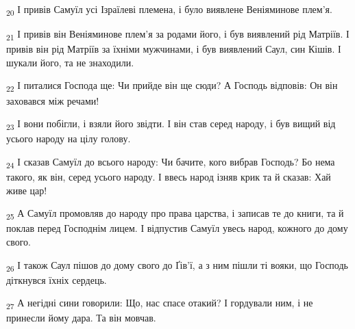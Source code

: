 \begin{tcolorbox}
\textsubscript{20} І привів Самуїл усі Ізраїлеві племена, і було виявлене Веніяминове плем'я.
\end{tcolorbox}
\begin{tcolorbox}
\textsubscript{21} І привів він Веніяминове плем'я за родами його, і був виявлений рід Матріїв. І привів він рід Матріїв за їхніми мужчинами, і був виявлений Саул, син Кішів. І шукали його, та не знаходили.
\end{tcolorbox}
\begin{tcolorbox}
\textsubscript{22} І питалися Господа ще: Чи прийде він ще сюди? А Господь відповів: Он він заховався між речами!
\end{tcolorbox}
\begin{tcolorbox}
\textsubscript{23} І вони побігли, і взяли його звідти. І він став серед народу, і був вищий від усього народу на цілу голову.
\end{tcolorbox}
\begin{tcolorbox}
\textsubscript{24} І сказав Самуїл до всього народу: Чи бачите, кого вибрав Господь? Бо нема такого, як він, серед усього народу. І ввесь народ ізняв крик та й сказав: Хай живе цар!
\end{tcolorbox}
\begin{tcolorbox}
\textsubscript{25} А Самуїл промовляв до народу про права царства, і записав те до книги, та й поклав перед Господнім лицем. І відпустив Самуїл увесь народ, кожного до дому свого.
\end{tcolorbox}
\begin{tcolorbox}
\textsubscript{26} І також Саул пішов до дому свого до Ґів'ї, а з ним пішли ті вояки, що Господь діткнувся їхніх сердець.
\end{tcolorbox}
\begin{tcolorbox}
\textsubscript{27} А негідні сини говорили: Що, нас спасе отакий? І гордували ним, і не принесли йому дара. Та він мовчав.
\end{tcolorbox}
